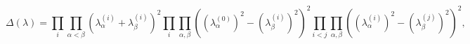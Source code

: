 \begin{equation}
\Delta (\lambda )=\prod_{i}\prod_{\alpha <\beta }(\lambda _{\alpha
}^{(i)}+\lambda _{\beta }^{(i)})^{2}\prod_{i}\prod_{\alpha ,\beta }\left(
(\lambda _{\alpha }^{(0)})^{2}-(\lambda _{\beta }^{(i)})^{2}\right)
^{2}\prod_{i<j}\prod_{\alpha ,\beta }\left( (\lambda _{\alpha
}^{(i)})^{2}-(\lambda _{\beta }^{(j)})^{2}\right) ^{2},
\end{equation}

